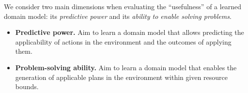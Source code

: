 \documentclass{article}
\theoremstyle{definition}
\theoremstyle{remark}
\newif\ifaddcomments
\newcommand{\roni}[1]{\ifaddcomments{\textcolor{red}{[Roni: #1]}}\fi}
\newcommand{\mauro}[1]{\ifaddcomments{\textcolor{green}{[Mauro: #1]}}\fi}
\newcommand{\gregor}[1]{\ifaddcomments{\textcolor{orange}{[Gregor: #1]}}\fi}
\begin{document}
We consider two main dimensions when evaluating the ``usefulness'' of a learned domain model: its \emph{predictive power} and its \emph{ability to enable solving problems}.
%
\begin{itemize}
    \item \textbf{Predictive power.} Aim to learn a domain model that allows predicting the applicability of actions in the environment and the outcomes of applying them. 
    \item \textbf{Problem-solving ability.} Aim to learn a domain model that enables the generation of applicable plans in the environment within given resource bounds. %
\end{itemize}
\end{document}
